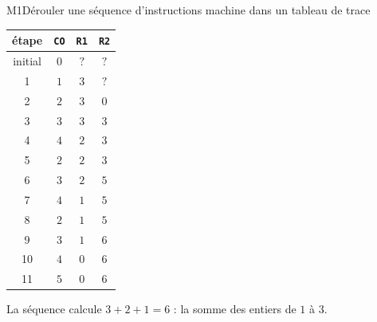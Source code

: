 \begin{fichemethode}{M1}{Dérouler une séquence d'instructions machine dans un tableau de trace}
\begin{center}
\begin{tabular}{c|c|c|c}
étape & \texttt{CO} & \texttt{R1} & \texttt{R2} \\
\hline
initial & $0$ & $?$ & $?$ \\
1 & $1$ & $3$ & $?$ \\
2 & $2$ & $3$ & $0$ \\
3 & $3$ & $3$ & $3$ \\
4 & $4$ & $2$ & $3$ \\
5 & $2$ & $2$ & $3$ \\
6 & $3$ & $2$ & $5$ \\
7 & $4$ & $1$ & $5$ \\
8 & $2$ & $1$ & $5$ \\
9 & $3$ & $1$ & $6$ \\
10 & $4$ & $0$ & $6$ \\
11 & $5$ & $0$ & $6$ \\
\end{tabular}
\end{center}

La séquence calcule $3 + 2 + 1 = 6$ : la somme des entiers de $1$ à $3$.



\end{fichemethode}
